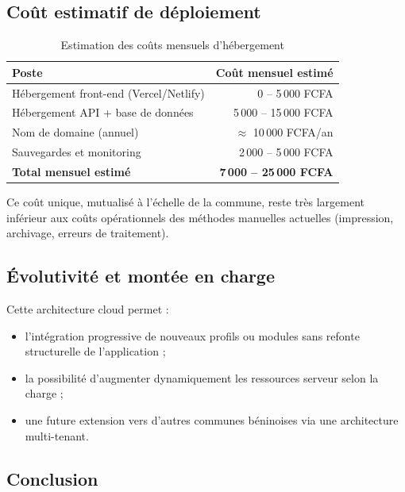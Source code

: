 \subsection*{Coût estimatif de déploiement}

\begin{table}[H]
\centering
\caption{Estimation des coûts mensuels d'hébergement}
\label{tab:couts}
\renewcommand{\arraystretch}{1.4}
\begin{tabular}{|l|r|}
\hline
\textbf{Poste} & \textbf{Coût mensuel estimé} \\
\hline
Hébergement front-end (Vercel/Netlify) & 0 -- 5\,000 FCFA \\
Hébergement API + base de données      & 5\,000 -- 15\,000 FCFA \\
Nom de domaine (annuel)                & $\approx$ 10\,000 FCFA/an \\
Sauvegardes et monitoring              & 2\,000 -- 5\,000 FCFA \\
\hline
\textbf{Total mensuel estimé}          & \textbf{7\,000 -- 25\,000 FCFA} \\
\hline
\end{tabular}
\end{table}

Ce coût unique, mutualisé à l'échelle de la commune, reste
très largement inférieur aux coûts opérationnels des méthodes
manuelles actuelles (impression, archivage, erreurs de traitement).

\subsection*{Évolutivité et montée en charge}

Cette architecture cloud permet :

\begin{itemize}
    \item l'intégration progressive de nouveaux profils ou modules
    sans refonte structurelle de l'application ;
    \item la possibilité d'augmenter dynamiquement les ressources
    serveur selon la charge ;
    \item une future extension vers d'autres communes béninoises
    via une architecture multi-tenant.
\end{itemize}

\subsection*{Conclusion}


